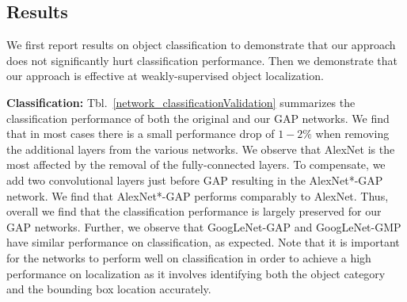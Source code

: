 \documentclass[10pt,twocolumn,letterpaper]{article}
\begin{document}





\subsection{Results}
\label{sec:locresults}
We first report results on object classification to demonstrate that our approach does not significantly hurt classification performance. Then we demonstrate that our approach is effective at weakly-supervised object localization.

\textbf{Classification:} Tbl.~\ref{network_classificationValidation} summarizes the classification performance of both the original and our GAP networks. We find that in most cases there is a small performance drop of $1 - 2\%$ when removing the additional layers from the various networks. We observe that AlexNet is the most affected by the removal of the fully-connected layers. To compensate, we add two convolutional layers just before GAP resulting in the AlexNet*-GAP network. We find that AlexNet*-GAP performs comparably to AlexNet. Thus, overall we find that the classification performance is largely preserved for our GAP networks. Further, we observe that GoogLeNet-GAP and GoogLeNet-GMP have similar performance on classification, as expected. Note that it is important for the networks to perform well on classification in order to achieve a high performance on localization as it involves identifying both the object category and the bounding box location accurately.
\end{document}
